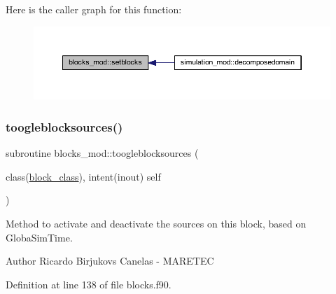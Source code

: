 Here is the caller graph for this function\+:\nopagebreak
\begin{figure}[H]
\begin{center}
\leavevmode
\includegraphics[width=350pt]{namespaceblocks__mod_a8f5a5d9e6cfd16cfd1b179092a204696_icgraph}
\end{center}
\end{figure}
\mbox{\label{namespaceblocks__mod_ab9e57cbf0103b632b2b2dfa4e4d4139c}} 
\subsubsection{\texorpdfstring{toogleblocksources()}{toogleblocksources()}}
{\footnotesize\ttfamily subroutine blocks\+\_\+mod\+::toogleblocksources (\begin{DoxyParamCaption}\item[{class(\mbox{\hyperlink{structblocks__mod_1_1block__class}{block\+\_\+class}}), intent(inout)}]{self }\end{DoxyParamCaption})\hspace{0.3cm}{\ttfamily [private]}}



Method to activate and deactivate the sources on this block, based on GlobaSim\+Time. 

\begin{DoxyAuthor}{Author}
Ricardo Birjukovs Canelas -\/ M\+A\+R\+E\+T\+EC 
\end{DoxyAuthor}


Definition at line 138 of file blocks.\+f90.


